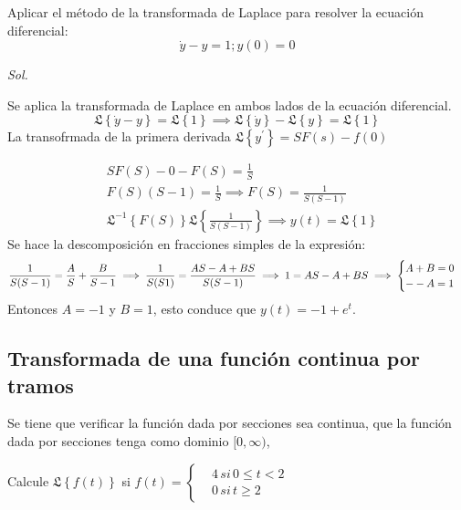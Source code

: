 \begin{example}
    Aplicar el método de la transformada de Laplace para resolver la ecuación diferencial:
    \begin{equation*}
        \dot{y} - y= 1; y(0) =0
    \end{equation*}
\end{example}
\textit{ Sol. }

Se aplica la transformada de Laplace en ambos lados de la ecuación diferencial.
\begin{equation*}
    \mathfrak{L}\left\{\dot{y} -y\right\} =\mathfrak{L}\left\{1\right\}\implies \mathfrak{L}\left\{\dot{y}\right\}-\mathfrak{L}\left\{y\right\} = \mathfrak{L}\left\{1\right\}
\end{equation*}
La transofrmada de la primera derivada $\mathfrak{L}\left\{y^{\prime}\right\}=SF(s)-f(0)$

\begin{align*}
    &SF(S)- 0-F(S) = \frac{1}{S}\\
    &F(S)(S -1) = \frac{1}{S}\implies F(S)= \frac{1}{S(S -1)}\\
    &\mathfrak{L}^{ -1}\left\{F(S)\right\} \mathfrak{L}\left\{\frac{1}{S(S -1)}\right\}\implies y(t) = \mathfrak{L}\left\{1\right\}
\end{align*}
Se hace la descomposición en fracciones simples de la expresión:
\begin{equation*}
    \frac{1}{S(S -1)} = \frac{A}{S} + \frac{B}{S -1}\implies \frac{1}{S(S 1)} = \frac{AS -A + BS}{S(S -1)}\\
    \implies 1 = AS - A + BS\implies \begin{cases} A + B = 0\\
    - -A = 1\end{cases} 
\end{equation*}
Entonces $A=-1$ y $B=1$, esto conduce que $y(t) = - 1 +e^t$.

\subsection{Transformada de una función continua por tramos}

Se tiene que verificar la función dada por secciones sea continua, que la función dada por secciones tenga como dominio $[0,\infty)$,

\begin{example}
    Calcule $\mathfrak{L}\left\{f(t)\right\} $ si $f(t)=\begin{cases}
        &4\,si\, 0\leq t<2\\
        &0\,si\, t\geq 2
    \end{cases}$
\end{example}

